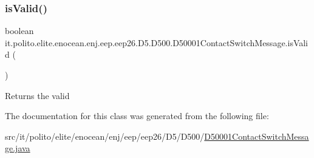 \subsubsection{\texorpdfstring{is\+Valid()}{isValid()}}
{\footnotesize\ttfamily boolean it.\+polito.\+elite.\+enocean.\+enj.\+eep.\+eep26.\+D5.\+D500.\+D50001\+Contact\+Switch\+Message.\+is\+Valid (\begin{DoxyParamCaption}{ }\end{DoxyParamCaption})}

\begin{DoxyReturn}{Returns}
the valid 
\end{DoxyReturn}


The documentation for this class was generated from the following file\+:\begin{DoxyCompactItemize}
\item 
src/it/polito/elite/enocean/enj/eep/eep26/\+D5/\+D500/\hyperlink{_d50001_contact_switch_message_8java}{D50001\+Contact\+Switch\+Message.\+java}\end{DoxyCompactItemize}
